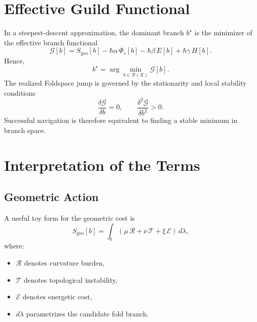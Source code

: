 \documentclass[11pt]{article}
\begin{document}
\section{Effective Guild Functional}
In a steepest-descent approximation, the dominant branch $b^{\star}$ is the minimizer of the effective branch functional
\begin{equation}
\mathcal{G}[b]
=
S_{\mathrm{geo}}[b]
- \hbar \alpha \, \Phi_c[b]
- \hbar \beta \, E[b]
+ \hbar \gamma \, H[b].
\label{eq:guild-functional}
\end{equation}
Hence,
\begin{equation}
b^{\star} = \arg\min_{b \in \mathcal{B}(X)} \mathcal{G}[b].
\end{equation}
The realized Foldspace jump is governed by the stationarity and local stability conditions
\begin{equation}
\frac{\delta \mathcal{G}}{\delta b} = 0,
\qquad
\frac{\delta^2 \mathcal{G}}{\delta b^2} > 0.
\end{equation}
Successful navigation is therefore equivalent to finding a stable minimum in branch space.

\section{Interpretation of the Terms}
\subsection{Geometric Action}
A useful toy form for the geometric cost is
\begin{equation}
S_{\mathrm{geo}}[b]
=
\int_b
\left(
\mu \, \mathcal{R}
+ \nu \, \mathcal{T}
+ \xi \, \mathcal{E}
\right)
\, d\lambda,
\end{equation}
where:
\begin{itemize}[leftmargin=2em]
    \item $\mathcal{R}$ denotes curvature burden,
    \item $\mathcal{T}$ denotes topological instability,
    \item $\mathcal{E}$ denotes energetic cost,
    \item $d\lambda$ parametrizes the candidate fold branch.
\end{itemize}
\end{document}
